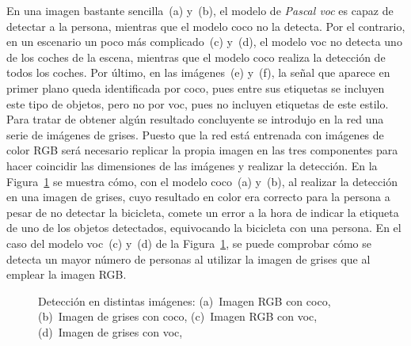 En una imagen bastante sencilla~(a) y~(b), el modelo de \textit{Pascal \acrshort{voc}} es capaz de detectar a la persona, mientras que el modelo \acrshort{coco} no la detecta. Por el contrario, en un escenario un poco más complicado~(c) y~(d), el modelo \acrshort{voc} no detecta uno de los coches de la escena, mientras que el modelo \acrshort{coco} realiza la detección de todos los coches. Por último, en las imágenes~(e) y~(f), la señal que aparece en primer plano queda identificada por \acrshort{coco}, pues entre sus etiquetas se incluyen este tipo de objetos, pero no por \acrshort{voc}, pues no incluyen etiquetas de este estilo.\\

Para tratar de obtener algún resultado concluyente se introdujo en la red una serie de imágenes de grises. Puesto que la red está entrenada con imágenes de color RGB será necesario replicar la propia imagen en las tres componentes para hacer coincidir las dimensiones de las imágenes y realizar la detección. En la Figura~\ref{fig.ssd2} se muestra cómo, con el modelo \acrshort{coco}~(a) y~(b), al realizar la detección en una imagen de grises, cuyo resultado en color era correcto para la persona a pesar de no detectar la bicicleta, comete un error a la hora de indicar la etiqueta de uno de los objetos detectados, equivocando la bicicleta con una persona. En el caso del modelo \acrshort{voc}~(c) y~(d) de la Figura~\ref{fig.ssd2}, se puede comprobar cómo se detecta un mayor número de personas al utilizar la imagen de grises que al emplear la imagen RGB.
\begin{figure}[H]
	\centering
	 \hspace{10pt}
	 \hspace{10pt}
	\caption{Detección en distintas imágenes: (a)~Imagen RGB con \acrshort{coco}, (b)~Imagen de grises con \acrshort{coco}, (c)~Imagen RGB con \acrshort{voc}, (d)~Imagen de grises con \acrshort{voc},}
	\label{fig.ssd2}
\end{figure}

